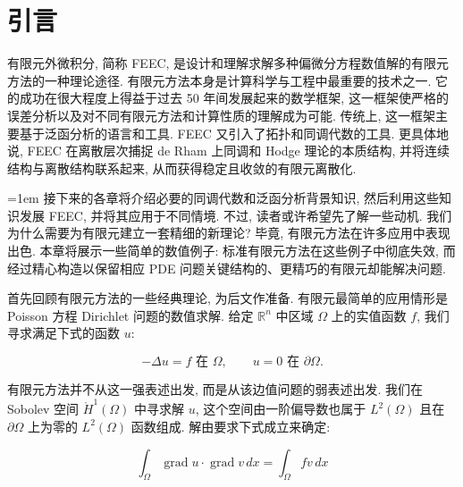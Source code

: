 \clearpage\setcounter{chapter}{0}
\chapter{{引言}}\label{chap:introduction}

{有限元外微积分, 简称 FEEC, 是设计和理解求解多种偏微分方程数值解的有限元方法的一种理论途径. 有限元方法本身是计算科学与工程中最重要的技术之一. 它的成功在很大程度上得益于过去 50 年间发展起来的数学框架, 这一框架使严格的误差分析以及对不同有限元方法和计算性质的理解成为可能. 传统上, 这一框架主要基于泛函分析的语言和工具. FEEC 又引入了拓扑和同调代数的工具. 更具体地说, FEEC 在离散层次捕捉 de Rham 上同调和 Hodge 理论的本质结构, 并将连续结构与离散结构联系起来, 从而获得稳定且收敛的有限元离散化.}

{\emergencystretch=1em
{接下来的各章将介绍必要的同调代数和泛函分析背景知识, 然后利用这些知识发展 FEEC, 并将其应用于不同情境. 不过, 读者或许希望先了解一些动机. 我们为什么需要为有限元建立一套精细的新理论? 毕竟, 有限元方法在许多应用中表现出色. 本章将展示一些简单的数值例子: 标准有限元方法在这些例子中彻底失效, 而经过精心构造以保留相应 PDE 问题关键结构的、更精巧的有限元却能解决问题.}
\par}

{首先回顾有限元方法的一些经典理论, 为后文作准备. 有限元最简单的应用情形是 Poisson 方程 Dirichlet 问题的数值求解. 给定 $\mathbb R^n$ 中区域 $\Omega$ 上的实值函数 $f$, 我们寻求满足下式的函数 $u$:}

\[
-\Delta u=f\text{{ 在 }}\Omega,\qquad u=0\text{{ 在 }}\partial\Omega.
\]

{有限元方法并不从这一强表述出发, 而是从该边值问题的弱表述出发. 我们在 Sobolev 空间 $\mathring H^1(\Omega)$ 中寻求解 $u$, 这个空间由一阶偏导数也属于 $L^2(\Omega)$ 且在 $\partial\Omega$ 上为零的 $L^2(\Omega)$ 函数组成. 解由要求下式成立来确定:}

\begin{equation}\label{eq:poisson-weak-form}
\int_\Omega\operatorname{grad}u\cdot\operatorname{grad}v\,dx=\int_\Omega fv\,dx
\end{equation}

